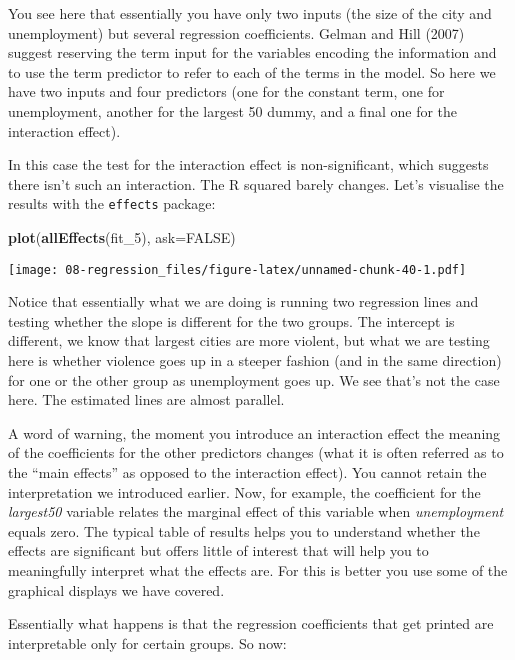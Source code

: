 \documentclass[
]{book}
\newenvironment{Shaded}{\begin{snugshade}}{\end{snugshade}}
\newcommand{\AttributeTok}[1]{\textcolor[rgb]{0.13,0.29,0.53}{#1}}
\newcommand{\ConstantTok}[1]{\textcolor[rgb]{0.56,0.35,0.01}{#1}}
\newcommand{\FunctionTok}[1]{\textcolor[rgb]{0.13,0.29,0.53}{\textbf{#1}}}
\newcommand{\NormalTok}[1]{#1}
\begin{document}
You see here that essentially you have only two inputs (the size of the city and unemployment) but several regression coefficients. Gelman and Hill (2007) suggest reserving the term input for the variables encoding the information and to use the term predictor to refer to each of the terms in the model. So here we have two inputs and four predictors (one for the constant term, one for unemployment, another for the largest 50 dummy, and a final one for the interaction effect).

In this case the test for the interaction effect is non-significant, which suggests there isn't such an interaction. The R squared barely changes. Let's visualise the results with the \texttt{effects} package:

\begin{Shaded}
\begin{Highlighting}[]
\FunctionTok{plot}\NormalTok{(}\FunctionTok{allEffects}\NormalTok{(fit\_5), }\AttributeTok{ask=}\ConstantTok{FALSE}\NormalTok{)}
\end{Highlighting}
\end{Shaded}

\texttt{[image: 08-regression\_files/figure-latex/unnamed-chunk-40-1.pdf]}

Notice that essentially what we are doing is running two regression lines and testing whether the slope is different for the two groups. The intercept is different, we know that largest cities are more violent, but what we are testing here is whether violence goes up in a steeper fashion (and in the same direction) for one or the other group as unemployment goes up. We see that's not the case here. The estimated lines are almost parallel.

A word of warning, the moment you introduce an interaction effect the meaning of the coefficients for the other predictors changes (what it is often referred as to the ``main effects'' as opposed to the interaction effect). You cannot retain the interpretation we introduced earlier. Now, for example, the coefficient for the \emph{largest50} variable relates the marginal effect of this variable when \emph{unemployment} equals zero. The typical table of results helps you to understand whether the effects are significant but offers little of interest that will help you to meaningfully interpret what the effects are. For this is better you use some of the graphical displays we have covered.

Essentially what happens is that the regression coefficients that get printed are interpretable only for certain groups. So now:
\end{document}

